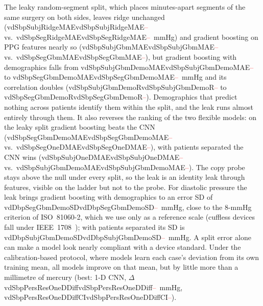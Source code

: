 \documentclass[journal]{IEEEtran}
\newcommand{\m}[1]{\ifcsname #1\endcsname\csname #1\endcsname\else\textcolor{red}{--}\fi}
\begin{document}
The leaky random-segment split, which places minutes-apart segments of the
same surgery on both sides, leaves ridge unchanged (\m{vdSbpSubjRidgeMAE} vs.\
\m{vdSbpSegRidgeMAE}~mmHg) and gradient boosting on PPG features nearly so
(\m{vdSbpSubjGbmMAE} vs.\ \m{vdSbpSegGbmMAE}), but gradient boosting with
demographics falls from \m{vdSbpSubjGbmDemoMAE} to \m{vdSbpSegGbmDemoMAE}~mmHg
and its correlation doubles (\m{vdSbpSubjGbmDemoR} to \m{vdSbpSegGbmDemoR}).
Demographics that predict nothing across patients identify them within the
split, and the leak runs almost entirely through them.  It also reverses the
ranking of the two flexible models: on the leaky split gradient boosting
beats the CNN (\m{vdSbpSegGbmDemoMAE} vs.\ \m{vdSbpSegOneDMAE}), with patients
separated the CNN wins (\m{vdSbpSubjOneDMAE} vs.\ \m{vdSbpSubjGbmDemoMAE}).  The
copy probe stays above the null under every split, so the leak is an
identity leak through features, visible on the ladder but not to the probe.
For diastolic pressure the leak brings gradient boosting with demographics
to an error SD of \m{vdDbpSegGbmDemoSD}~mmHg, close to the 8-mmHg criterion of
ISO~81060-2, which we use only as a reference scale (cuffless devices fall
under IEEE~1708~\cite{ieee1708}); with patients separated its SD is
\m{vdDbpSubjGbmDemoSD}~mmHg.  A split error alone can make a model look nearly
compliant with a device standard.  Under the calibration-based protocol,
where models learn each case's deviation from its own training mean, all
models improve on that mean, but by little more than a millimetre of mercury
(best: 1-D CNN, $\Delta$ \m{vdSbpPersResOneDDiff}~mmHg, \m{vdSbpPersResOneDDiffCI}).
\end{document}
